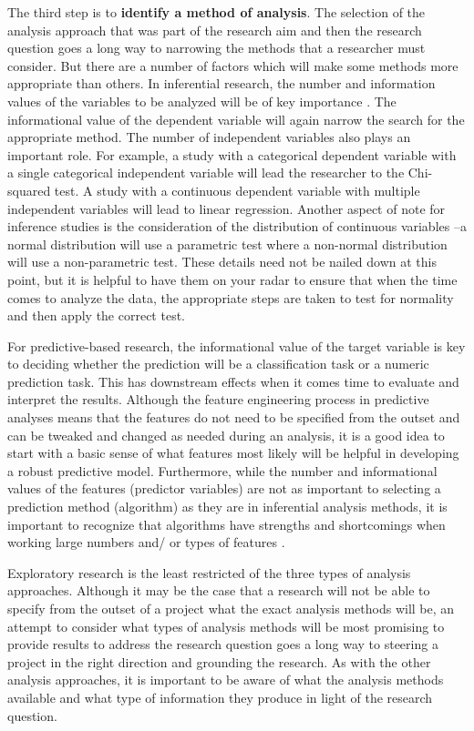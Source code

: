 \documentclass[
]{article}
\begin{document}
The third step is to \textbf{identify a method of analysis}. The selection of the analysis approach that was part of the research aim and then the research question goes a long way to narrowing the methods that a researcher must consider. But there are a number of factors which will make some methods more appropriate than others. In inferential research, the number and information values of the variables to be analyzed will be of key importance \citep{Gries2013a}. The informational value of the dependent variable will again narrow the search for the appropriate method. The number of independent variables also plays an important role. For example, a study with a categorical dependent variable with a single categorical independent variable will lead the researcher to the Chi-squared test. A study with a continuous dependent variable with multiple independent variables will lead to linear regression. Another aspect of note for inference studies is the consideration of the distribution of continuous variables --a normal distribution will use a parametric test where a non-normal distribution will use a non-parametric test. These details need not be nailed down at this point, but it is helpful to have them on your radar to ensure that when the time comes to analyze the data, the appropriate steps are taken to test for normality and then apply the correct test.

For predictive-based research, the informational value of the target variable is key to deciding whether the prediction will be a classification task or a numeric prediction task. This has downstream effects when it comes time to evaluate and interpret the results. Although the feature engineering process in predictive analyses means that the features do not need to be specified from the outset and can be tweaked and changed as needed during an analysis, it is a good idea to start with a basic sense of what features most likely will be helpful in developing a robust predictive model. Furthermore, while the number and informational values of the features (predictor variables) are not as important to selecting a prediction method (algorithm) as they are in inferential analysis methods, it is important to recognize that algorithms have strengths and shortcomings when working large numbers and/ or types of features \citep{Lantz2013}.

Exploratory research is the least restricted of the three types of analysis approaches. Although it may be the case that a research will not be able to specify from the outset of a project what the exact analysis methods will be, an attempt to consider what types of analysis methods will be most promising to provide results to address the research question goes a long way to steering a project in the right direction and grounding the research. As with the other analysis approaches, it is important to be aware of what the analysis methods available and what type of information they produce in light of the research question.
\end{document}
